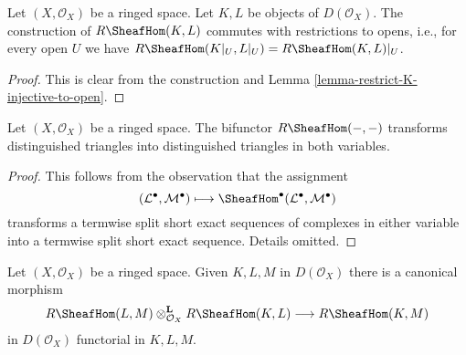 \begin{lemma}
\label{lemma-restriction-RHom-to-U}
Let $(X, \mathcal{O}_X)$ be a ringed space. Let $K, L$ be objects
of $D(\mathcal{O}_X)$. The construction of $R\SheafHom(K, L)$
commutes with restrictions to opens, i.e.,
for every open $U$ we have
$R\SheafHom(K|_U, L|_U) = R\SheafHom(K, L)|_U$.
\end{lemma}

\begin{proof}
This is clear from the construction and
Lemma \ref{lemma-restrict-K-injective-to-open}.
\end{proof}

\begin{lemma}
\label{lemma-RHom-triangulated}
Let $(X, \mathcal{O}_X)$ be a ringed space. The bifunctor $R\SheafHom(- , -)$
transforms distinguished triangles into distinguished triangles in both
variables.
\end{lemma}

\begin{proof}
This follows from the observation that the assignment
$$
(\mathcal{L}^\bullet, \mathcal{M}^\bullet) \longmapsto
\SheafHom^\bullet(\mathcal{L}^\bullet, \mathcal{M}^\bullet)
$$
transforms a termwise split short exact sequences of complexes in either
variable into a termwise split short exact sequence. Details omitted.
\end{proof}

\begin{lemma}
\label{lemma-internal-hom-composition}
Let $(X, \mathcal{O}_X)$ be a ringed space. Given $K, L, M$ in
$D(\mathcal{O}_X)$ there is a canonical morphism
$$
R\SheafHom(L, M) \otimes_{\mathcal{O}_X}^\mathbf{L} R\SheafHom(K, L)
\longrightarrow R\SheafHom(K, M)
$$
in $D(\mathcal{O}_X)$ functorial in $K, L, M$.
\end{lemma}

